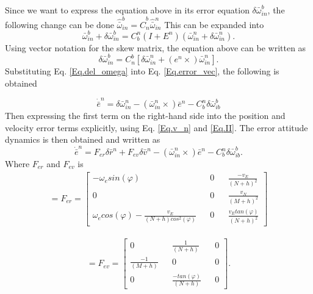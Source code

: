Since we want to express the equation above in its error equation $\delta \bar{\omega}_{in}^b$, the following change can be done $\hat{\bar{\omega}}_{in}^b = \hat{C}_n^b\hat{\bar{\omega}}_{in}^n$ This can be expanded into
\begin{equation}
\bar{\omega}_{in}^b + \delta \bar{\omega}_{in}^b = C_b^n(I+E^n)(\bar{\omega}_{in}^n+\delta\bar{\omega}_{in}^n).
\end{equation}
Using vector notation for the skew matrix, the equation above can be written as
\begin{equation}
\delta\bar{\omega}_{in}^b = C_n^b [\delta\bar{\omega}_{in}^n + (e^n\times)\bar{\omega}_{in}^n].
\label{Eq.del_omega}
\end{equation}
Substituting Eq. \eqref{Eq.del_omega} into Eq. \eqref{Eq.error_vec}, the following is obtained

\begin{equation}
\dot{\bar{e}}^n = \delta\bar{\omega}_{in}^n -(\bar{\omega}_{in}^n \times )\bar{e}^n - C_b^n\delta \bar{\omega}_{ib}^b 
\label{Eq.err_final}
\end{equation}
Then expressing the first term on the right-hand side into the position and velocity error terms explicitly, using Eq. \eqref{Eq.v_n} and \eqref{Eq.II}. The error attitude dynamics is then obtained and written as
\begin{equation}
\dot{\bar{e}}^n = F_{er}\delta \bar{r}^n + F_{ev}\delta \bar{v}^n - (\bar{\omega}_{in}^n \times)\bar{e}^n - C_b^n\delta\bar{\omega}_{ib}^b.
\end{equation}
Where $F_{er}$ and $F_{ev}$ is	
\begin{align} = 
F_{er} =
\begin{bmatrix}
-\omega_e sin(\varphi) && 0 && \frac{-v_E}{(N+h)^2}\\
0 && 0 && \frac{v_N}{(M+h)^2} \\
\omega_e cos(\varphi) - \frac{v_E}{(N+h)cos^2(\varphi)} && 0 && \frac{v_E tan(\varphi)}{(N+h)^2}
\end{bmatrix}
\label{Eq.Fer}
\end{align}

\begin{align} = 
F_{ev} =
\begin{bmatrix}
0 && \frac{1}{(N+h)} && 0\\
\frac{-1}{(M+h)} && 0 && 0\\
0 && \frac{-tan(\varphi)}{(N+h)} && 0
\end{bmatrix}.
\label{Eq.Fev}
\end{align}


